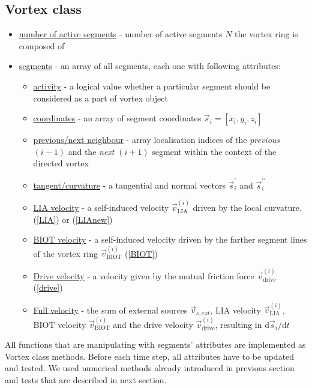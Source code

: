 \subsection*{Vortex class}

\begin{itemize}
	\item \underline{number of active segments} - number of active segments $N$ the vortex ring is composed of
	\item \underline{segments} - an array of all segments, each one with following attributes:
	\begin{itemize}
		\item \underline{activity} - a logical value whether a particular segment should be considered as a part of vortex object
		\item \underline{coordinates} - an array of segment coordinates $\vec{s}_i = [x_i,y_i,z_i]$
		\item \underline{previous/next neighbour} - array localisation indices of the \textit{previous} $(i-1)$ and the \textit{next} $(i+1)$ segment within the context of the directed vortex
		\item \underline{tangent/curvature} - a tangential and normal vectors $\vec{s}^{\prime}_i$ and $\vec{s}^{\prime\prime}_i$

		\item \underline{LIA velocity} - a self-induced velocity $\vec{v}_{\text{LIA}}^{(i)}$ driven by the local curvature. (\ref{LIA}) or (\ref{LIAnew})
		\item \underline{BIOT velocity} - a self-induced velocity driven by the farther segment lines of the vortex ring $\vec{v}_{\text{BIOT}}^{(i)}$ (\ref{BIOT})

		\item \underline{Drive velocity} - a velocity given by the mutual friction force $\vec{v}_{\text{drive}}^{(i)}$ (\ref{drive})
		\item \underline{Full velocity} - the sum of external sources $\vec{v}_{s,ext}$, LIA velocity $\vec{v}_{\text{LIA}}^{(i)}$, BIOT velocity $\vec{v}_{\text{BIOT}}^{(i)}$ and the drive velocity $\vec{v}_{\text{drive}}^{(i)}$, resulting in $\text{d}\vec{s}_i / \text{d}t$
	\end{itemize}
\end{itemize}

All functions that are manipulating with segments' attributes are implemented as Vortex class methods. Before each time step, all attributes have to be updated and tested. We used numerical methods already introduced in previous section and tests that are described in next section.

